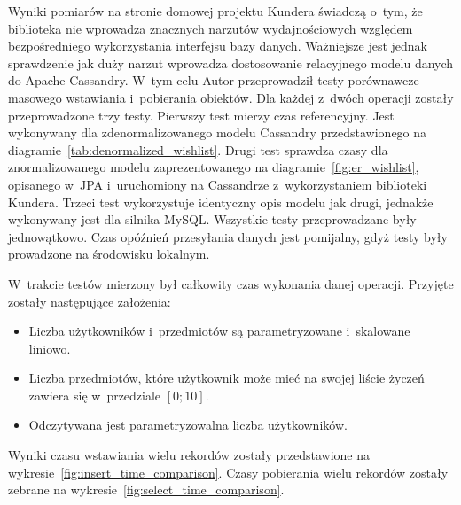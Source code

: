 Wyniki pomiarów na stronie domowej projektu Kundera świadczą o~tym, że biblioteka nie wprowadza znacznych narzutów wydajnościowych względem bezpośredniego wykorzystania interfejsu bazy danych. Ważniejsze jest jednak sprawdzenie jak duży narzut wprowadza dostosowanie relacyjnego modelu danych do Apache Cassandry. W~tym celu Autor przeprowadził testy porównawcze masowego wstawiania i~pobierania obiektów. Dla każdej z~dwóch operacji zostały przeprowadzone trzy testy. Pierwszy test mierzy czas referencyjny. Jest wykonywany dla zdenormalizowanego modelu Cassandry przedstawionego na diagramie~\ref{tab:denormalized_wishlist}. Drugi test sprawdza czasy dla znormalizowanego modelu zaprezentowanego na diagramie~\ref{fig:er_wishlist}, opisanego w~JPA i~uruchomiony na Cassandrze z~wykorzystaniem biblioteki Kundera. Trzeci test wykorzystuje identyczny opis modelu jak drugi, jednakże wykonywany jest dla silnika MySQL. Wszystkie testy przeprowadzane były jednowątkowo. Czas opóźnień przesyłania danych jest pomijalny, gdyż testy były prowadzone na środowisku lokalnym.

W~trakcie testów mierzony był całkowity czas wykonania danej operacji. Przyjęte zostały następujące założenia:

\begin{itemize}
	\item Liczba użytkowników i~przedmiotów są parametryzowane i~skalowane liniowo.
	\item Liczba przedmiotów, które użytkownik może mieć na swojej liście życzeń zawiera się w~przedziale $[0;10]$.
	\item Odczytywana jest parametryzowalna liczba użytkowników.
\end{itemize}

\noindent Wyniki czasu wstawiania wielu rekordów zostały przedstawione na wykresie~\ref{fig:insert_time_comparison}. Czasy pobierania wielu rekordów zostały zebrane na wykresie~\ref{fig:select_time_comparison}.

